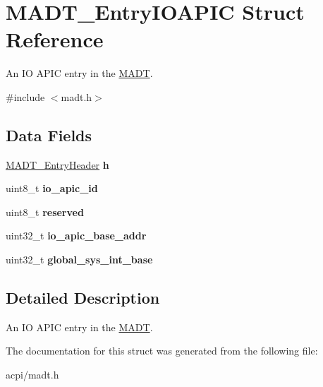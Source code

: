 \hypertarget{structMADT__EntryIOAPIC}{}\section{M\+A\+D\+T\+\_\+\+Entry\+I\+O\+A\+P\+IC Struct Reference}
\label{structMADT__EntryIOAPIC}


An IO A\+P\+IC entry in the \hyperlink{structMADT}{M\+A\+DT}.  




{\ttfamily \#include $<$madt.\+h$>$}

\subsection*{Data Fields}
\begin{DoxyCompactItemize}
\item 
\hyperlink{structMADT__EntryHeader}{M\+A\+D\+T\+\_\+\+Entry\+Header} {\bfseries h}\hypertarget{structMADT__EntryIOAPIC_a167fc2b09fbbf498a101237742ced5ca}{}\label{structMADT__EntryIOAPIC_a167fc2b09fbbf498a101237742ced5ca}

\item 
uint8\+\_\+t {\bfseries io\+\_\+apic\+\_\+id}\hypertarget{structMADT__EntryIOAPIC_a265b39d1136182beda87de2ecd412c9f}{}\label{structMADT__EntryIOAPIC_a265b39d1136182beda87de2ecd412c9f}

\item 
uint8\+\_\+t {\bfseries reserved}\hypertarget{structMADT__EntryIOAPIC_a70fdd456481aee5454c1f86d0444d530}{}\label{structMADT__EntryIOAPIC_a70fdd456481aee5454c1f86d0444d530}

\item 
uint32\+\_\+t {\bfseries io\+\_\+apic\+\_\+base\+\_\+addr}\hypertarget{structMADT__EntryIOAPIC_afe6d7d2321059b1aeb614b8dcf17c0af}{}\label{structMADT__EntryIOAPIC_afe6d7d2321059b1aeb614b8dcf17c0af}

\item 
uint32\+\_\+t {\bfseries global\+\_\+sys\+\_\+int\+\_\+base}\hypertarget{structMADT__EntryIOAPIC_a141b89d9fa6b840ae963d68bdcd96c09}{}\label{structMADT__EntryIOAPIC_a141b89d9fa6b840ae963d68bdcd96c09}

\end{DoxyCompactItemize}


\subsection{Detailed Description}
An IO A\+P\+IC entry in the \hyperlink{structMADT}{M\+A\+DT}. 

The documentation for this struct was generated from the following file\+:\begin{DoxyCompactItemize}
\item 
acpi/madt.\+h\end{DoxyCompactItemize}
